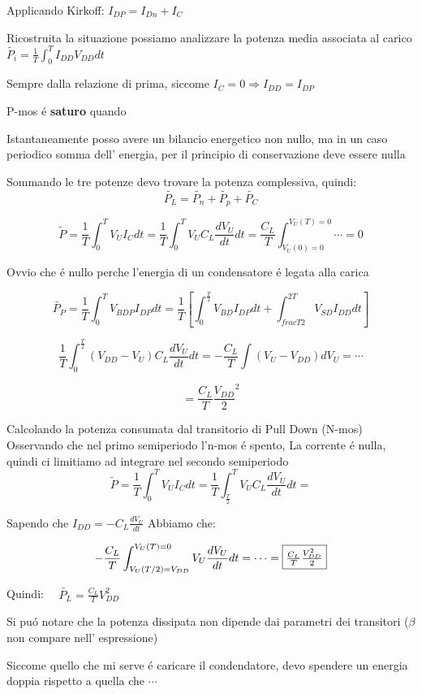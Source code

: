 Applicando Kirkoff: $I_{DP} = I_{Dn} + I_C$

Ricostruita la situazione possiamo analizzare la potenza media associata al carico $\tilde{P_i} = \frac{1}{T}\int_0^T I_{DD} V_{DD} dt $

Sempre dalla relazione di prima, siccome $I_C = 0 \Rightarrow I_{DD} = I_{DP}$


P-mos \'e \textbf{saturo} quando 

Istantaneamente posso avere un bilancio energetico non nullo, ma in un caso periodico somma dell' energia, per il principio di conservazione deve essere nulla

Sommando le tre potenze devo trovare la potenza complessiva, quindi:
\[
    \tilde{P_L} = \tilde{P_n} + \tilde{P_p} + \tilde{P_C}
\]

\[
    \tilde{P} = \frac{1}{T}\int_0^T  V_U I_C dt = \frac{1}{T} \int_0^T V_U C_L \frac{dV_U}{dt} dt =
    \frac{C_L}{T}\int_{V_U(0)=0}^{V_U(T) = 0} \cdots = 0
\]

Ovvio che \'e nullo perche l'energia di un condensatore \'e legata alla carica

\[
    \tilde{P_P} = \frac{1}{T} \int_0^T V_{BDP} I_{DP} dt = \frac{1}{T}\left[ \int_0^{\frac{T}{2}} V_{BD} I_{DP} dt + \int_{frac{T}{2}}^{2T} V_{SD}I_{DD}dt\right]
\]


\[
    \frac{1}{T} \int_0^{\frac{T}{2}} (V_{DD} - V_U) C_L \frac{dV_U}{dt}dt = -\frac{C_L}{T} \int (V_U - V_{DD}) dV_U = \cdots
\]

\[
    =\frac{C_L}{T} \frac{V_{DD}}{2}^2
\]

Calcolando la potenza consumata dal transitorio di Pull Down (N-mos)
Osservando che nel primo semiperiodo l'n-mos \'e spento, La corrente \'e nulla, quindi ci limitiamo ad integrare nel secondo semiperiodo
\[
    \tilde{P} = \frac{1}{T}\int_0^T  V_U I_C dt = \frac{1}{T} \int_{\frac{T}{2}}^T V_U C_L \frac{dV_U}{dt} dt =
\]

Sapendo che $I_{DD} = -C_L\frac{dV_U}{dt}$ Abbiamo che:

\[
    -\frac{C_L}{T} \int_{V_U(T/2) = V_{DD}} ^ {V_U(T) = 0} V_U \frac{dV_U}{dt} dt = \cdots = \framebox{$\frac{C_L}{T} \frac{V_{DD}^2}{2}$}
\]

Quindi: $\quad \tilde{P_L} = \frac{C_L}{T} {V_{DD}^2} $

Si pu\'o notare che la potenza dissipata non dipende dai parametri dei transitori ($\beta$ non compare nell' espressione)

Siccome quello che mi serve \'e caricare il condendatore, devo spendere un energia doppia rispetto a quella che $\cdots$

